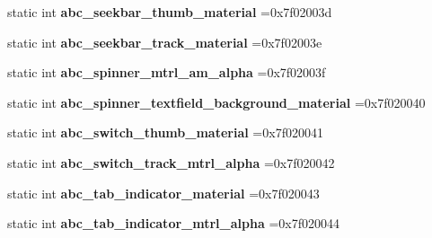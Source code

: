 \begin{DoxyCompactItemize}
static int {\bfseries abc\+\_\+seekbar\+\_\+thumb\+\_\+material} =0x7f02003d
\item 
\mbox{\label{classandroid_1_1support_1_1design_1_1R_1_1drawable_a3a10ffdb1be932f5db25e813e268c5b8}} 
static int {\bfseries abc\+\_\+seekbar\+\_\+track\+\_\+material} =0x7f02003e
\item 
\mbox{\label{classandroid_1_1support_1_1design_1_1R_1_1drawable_aff9757ecbbabd40ab5e4ae46f7f6267a}} 
static int {\bfseries abc\+\_\+spinner\+\_\+mtrl\+\_\+am\+\_\+alpha} =0x7f02003f
\item 
\mbox{\label{classandroid_1_1support_1_1design_1_1R_1_1drawable_ab10b0473e109c0bd2e728410fd939776}} 
static int {\bfseries abc\+\_\+spinner\+\_\+textfield\+\_\+background\+\_\+material} =0x7f020040
\item 
\mbox{\label{classandroid_1_1support_1_1design_1_1R_1_1drawable_aa770bb831d321598dd5c68b5892b2a53}} 
static int {\bfseries abc\+\_\+switch\+\_\+thumb\+\_\+material} =0x7f020041
\item 
\mbox{\label{classandroid_1_1support_1_1design_1_1R_1_1drawable_a8bed88dd932c3664796806d68590c4c1}} 
static int {\bfseries abc\+\_\+switch\+\_\+track\+\_\+mtrl\+\_\+alpha} =0x7f020042
\item 
\mbox{\label{classandroid_1_1support_1_1design_1_1R_1_1drawable_afbcce5e6d64cbe52afd06884c3d298bc}} 
static int {\bfseries abc\+\_\+tab\+\_\+indicator\+\_\+material} =0x7f020043
\item 
\mbox{\label{classandroid_1_1support_1_1design_1_1R_1_1drawable_a2b5f4d97e4ad7ab4e518b401a5be1515}} 
static int {\bfseries abc\+\_\+tab\+\_\+indicator\+\_\+mtrl\+\_\+alpha} =0x7f020044
\item 
\mbox{\label{classandroid_1_1support_1_1design_1_1R_1_1drawable_a43c421f4317477587f8e09d067a24391}} 

\end{DoxyCompactItemize}
